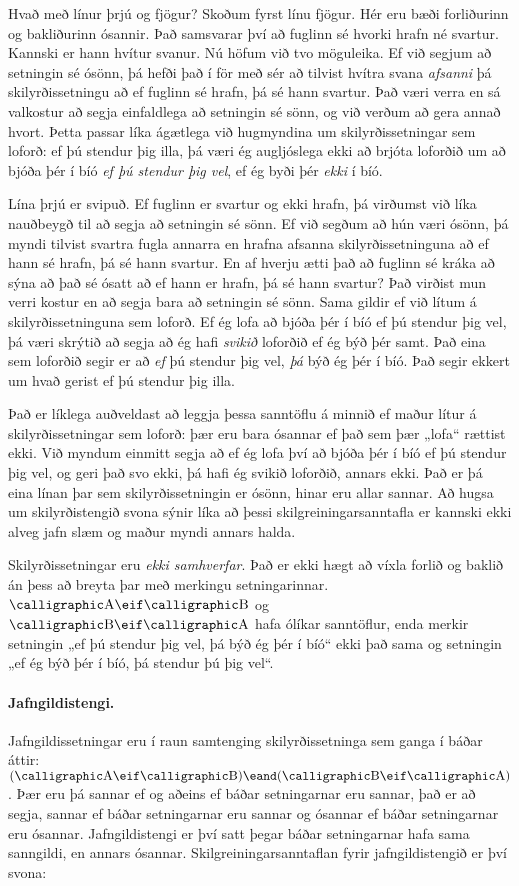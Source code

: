 Hvað með línur þrjú og fjögur? Skoðum fyrst línu fjögur. Hér eru bæði forliðurinn og bakliðurinn ósannir. Það samsvarar því að fuglinn sé hvorki hrafn né svartur. Kannski er hann hvítur svanur. Nú höfum við tvo möguleika. Ef við segjum að setningin sé ósönn, þá hefði það í för með sér að tilvist hvítra svana \emph{afsanni} þá skilyrðissetningu að ef fuglinn sé hrafn, þá sé hann svartur. Það væri verra en sá valkostur að segja einfaldlega að setningin sé sönn, og við verðum að gera annað hvort. Þetta passar líka ágætlega við hugmyndina um skilyrðissetningar sem loforð: ef þú stendur þig illa, þá væri ég augljóslega ekki að brjóta loforðið um að bjóða þér í bíó \emph{ef þú stendur þig vel}, ef ég byði þér \emph{ekki} í bíó.

Lína þrjú er svipuð. Ef fuglinn er svartur og ekki hrafn, þá virðumst við líka nauðbeygð til að segja að setningin sé sönn. Ef við segðum að hún væri ósönn, þá myndi tilvist svartra fugla annarra en hrafna afsanna skilyrðissetninguna að ef hann sé hrafn, þá sé hann svartur. En af hverju ætti það að fuglinn sé kráka að sýna að það sé ósatt að ef hann er hrafn, þá sé hann svartur? Það virðist mun verri kostur en að segja bara að setningin sé sönn. Sama gildir ef við lítum á skilyrðissetninguna sem loforð. Ef ég lofa að bjóða þér í bíó ef þú stendur þig vel, þá væri skrýtið að segja að ég hafi \emph{svikið} loforðið ef ég býð þér samt. Það eina sem loforðið segir er að \emph{ef} þú stendur þig vel, \emph{þá} býð ég þér í bíó. Það segir ekkert um hvað gerist ef þú stendur þig illa.

Það er líklega auðveldast að leggja þessa sanntöflu á minnið ef maður lítur á skilyrðissetningar sem loforð: þær eru bara ósannar ef það sem þær „lofa“ rættist ekki. Við myndum einmitt segja að ef ég lofa því að bjóða þér í bíó ef þú stendur þig vel, og geri það svo ekki, þá hafi ég svikið loforðið, annars ekki. Það er þá eina línan þar sem skilyrðissetningin er ósönn, hinar eru allar sannar. Að hugsa um skilyrðistengið svona sýnir líka að þessi skilgreiningarsanntafla er kannski ekki alveg jafn slæm og maður myndi annars halda.

Skilyrðissetningar eru \emph{ekki samhverfar}. Það er ekki hægt að víxla forlið og baklið án þess að breyta þar með merkingu setningarinnar. $\meta{A} \eif \meta{B}$ og $\meta{B} \eif \meta{A}$ hafa ólíkar sanntöflur, enda merkir setningin „ef þú stendur þig vel, þá býð ég þér í bíó“ ekki það sama og setningin „ef ég býð þér í bíó, þá stendur þú þig vel“.

\paragraph{Jafngildistengi.} Jafngildissetningar eru í raun samtenging skilyrðissetninga sem ganga í báðar áttir: $(\meta{A} \eif \meta{B}) \eand (\meta{B} \eif \meta{A})$. Þær eru þá sannar ef og aðeins ef báðar setningarnar eru sannar, það er að segja, sannar ef báðar setningarnar eru sannar og ósannar ef báðar setningarnar eru ósannar. Jafngildistengi er því satt þegar báðar setningarnar hafa sama sanngildi, en annars ósannar. Skilgreiningarsanntaflan fyrir jafngildistengið er því svona:

